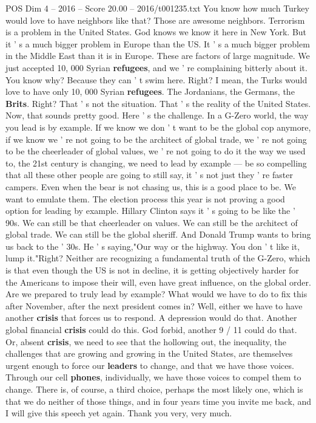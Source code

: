 \begin{textsample}{POS Dim 4 – 2016 – Score 20.00 – 2016/t001235.txt}
You know how much Turkey would love to have neighbors like that?
Those are awesome neighbors.
Terrorism is a problem in the United States.
God knows we know it here in New York.
But it ' s a much bigger problem in Europe than the US.
It ' s a much bigger problem in the Middle East than it is in Europe.
These are factors of large magnitude.
We just accepted 10, 000 Syrian \textbf{refugees}, and we ' re complaining bitterly about it.
You know why?
Because they can ' t swim here.
Right?
I mean, the Turks would love to have only 10, 000 Syrian \textbf{refugees}.
The Jordanians, the Germans, the \textbf{Brits}.
Right?
That ' s not the situation.
That ' s the reality of the United States.
Now, that sounds pretty good.
Here ' s the challenge.
In a G-Zero world, the way you lead is by example.
If we know we don ' t want to be the global cop anymore, if we know we ' re not going to be the architect of global trade, we ' re not going to be the cheerleader of global values, we ' re not going to do it the way we used to, the 21st century is changing, we need to lead by example — be so compelling that all these other people are going to still say, it ' s not just they ' re faster campers.
Even when the bear is not chasing us, this is a good place to be.
We want to emulate them.
The election process this year is not proving a good option for leading by example.
Hillary Clinton says it ' s going to be like the ' 90s.
We can still be that cheerleader on values.
We can still be the architect of global trade.
We can still be the global sheriff.
And Donald Trump wants to bring us back to the ' 30s.
He ' s saying,"Our way or the highway.
You don ' t like it, lump it."Right?
Neither are recognizing a fundamental truth of the G-Zero, which is that even though the US is not in decline, it is getting objectively harder for the Americans to impose their will, even have great influence, on the global order.
Are we prepared to truly lead by example?
What would we have to do to fix this after November, after the next president comes in?
Well, either we have to have another \textbf{crisis} that forces us to respond.
A depression would do that.
Another global financial \textbf{crisis} could do this.
God forbid, another 9 / 11 could do that.
Or, absent \textbf{crisis}, we need to see that the hollowing out, the inequality, the challenges that are growing and growing in the United States, are themselves urgent enough to force our \textbf{leaders} to change, and that we have those voices.
Through our cell \textbf{phones}, individually, we have those voices to compel them to change.
There is, of course, a third choice, perhaps the most likely one, which is that we do neither of those things, and in four years time you invite me back, and I will give this speech yet again.
Thank you very, very much.

\end{textsample}
